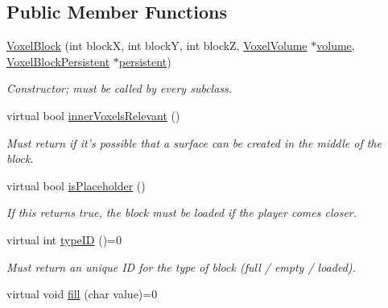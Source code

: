 \subsection*{\-Public \-Member \-Functions}
\begin{DoxyCompactItemize}
\item 
\hypertarget{classVoxelBlock_af8c1dd1803de510985dda2be4dd4a3df}{
\hyperlink{classVoxelBlock_af8c1dd1803de510985dda2be4dd4a3df}{\-Voxel\-Block} (int block\-X, int block\-Y, int block\-Z, \hyperlink{classVoxelVolume}{\-Voxel\-Volume} $\ast$\hyperlink{classVoxelBlock_aa8398251c9d5d3ba466e8993bcb6eb38}{volume}, \hyperlink{classVoxelBlockPersistent}{\-Voxel\-Block\-Persistent} $\ast$\hyperlink{classVoxelBlock_ad9d2e2c26398379b6a92e2e5ea4ab20d}{persistent})}
\label{d1/d83/classVoxelBlock_af8c1dd1803de510985dda2be4dd4a3df}

\begin{DoxyCompactList}\small\item\em \-Constructor; must be called by every subclass. \end{DoxyCompactList}\item 
\hypertarget{classVoxelBlock_aa181e86d61a75336fec2f3703edf61b2}{
virtual bool \hyperlink{classVoxelBlock_aa181e86d61a75336fec2f3703edf61b2}{inner\-Voxels\-Relevant} ()}
\label{d1/d83/classVoxelBlock_aa181e86d61a75336fec2f3703edf61b2}

\begin{DoxyCompactList}\small\item\em \-Must return if it's possible that a surface can be created in the middle of the block. \end{DoxyCompactList}\item 
\hypertarget{classVoxelBlock_ab7afbc6b3240f0f9d4c82cf4048ca440}{
virtual bool \hyperlink{classVoxelBlock_ab7afbc6b3240f0f9d4c82cf4048ca440}{is\-Placeholder} ()}
\label{d1/d83/classVoxelBlock_ab7afbc6b3240f0f9d4c82cf4048ca440}

\begin{DoxyCompactList}\small\item\em \-If this returns true, the block must be loaded if the player comes closer. \end{DoxyCompactList}\item 
\hypertarget{classVoxelBlock_accb9ca5dcef66d702d426d579e88a31e}{
virtual int \hyperlink{classVoxelBlock_accb9ca5dcef66d702d426d579e88a31e}{type\-I\-D} ()=0}
\label{d1/d83/classVoxelBlock_accb9ca5dcef66d702d426d579e88a31e}

\begin{DoxyCompactList}\small\item\em \-Must return an unique \-I\-D for the type of block (full / empty / loaded). \end{DoxyCompactList}\item 
\hypertarget{classVoxelBlock_a370ce40945679f715a6b2475c8b5f297}{
virtual void \hyperlink{classVoxelBlock_a370ce40945679f715a6b2475c8b5f297}{fill} (char value)=0}
\label{d1/d83/classVoxelBlock_a370ce40945679f715a6b2475c8b5f297}


\end{DoxyCompactItemize}
